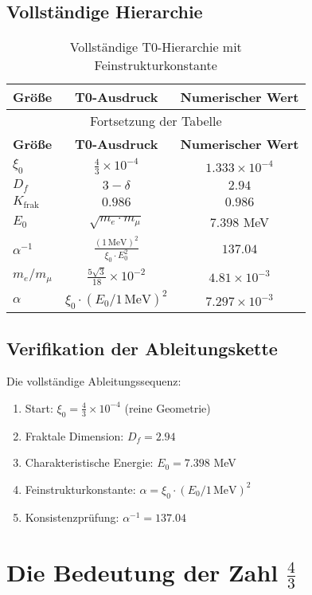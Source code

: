 \documentclass[12pt,a4paper]{article}
\newcommand{\xipar}{\xi_0}
\newcommand{\Kfrak}{K_{\text{frak}}}
\newcommand{\Ezero}{E_0}
\newcommand{\Dfrak}{D_f}
\begin{document}
	\subsection{Vollständige Hierarchie}
	
	\begin{longtable}{lcc}
		\caption{Vollständige T0-Hierarchie mit Feinstrukturkonstante} \\
		\toprule
		\textbf{Größe} & \textbf{T0-Ausdruck} & \textbf{Numerischer Wert} \\
		\midrule
		\endfirsthead
		\multicolumn{3}{c}{Fortsetzung der Tabelle} \\
		\toprule
		\textbf{Größe} & \textbf{T0-Ausdruck} & \textbf{Numerischer Wert} \\
		\midrule
		\endhead
		\bottomrule
		\endlastfoot
		$\xipar$ & $\frac{4}{3} \times 10^{-4}$ & $1.333 \times 10^{-4}$ \\
		$\Dfrak$ & $3 - \delta$ & $2.94$ \\
		$\Kfrak$ & $0.986$ & $0.986$ \\
		$\Ezero$ & $\sqrt{m_e \cdot m_\mu}$ & $7.398$ MeV \\
		$\alpha^{-1}$ & $\frac{(1\,\text{MeV})^2}{\xipar \cdot \Ezero^2}$ & $137.04$ \\
		$m_e/m_\mu$ & $\frac{5\sqrt{3}}{18} \times 10^{-2}$ & $4.81 \times 10^{-3}$ \\
		$\alpha$ & $\xipar \cdot (\Ezero/1\,\text{MeV})^2$ & $7.297 \times 10^{-3}$ \\
	\end{longtable}
	
	\subsection{Verifikation der Ableitungskette}
	
	Die vollständige Ableitungssequenz:
	\begin{enumerate}
		\item Start: $\xipar = \frac{4}{3} \times 10^{-4}$ (reine Geometrie)
		\item Fraktale Dimension: $\Dfrak = 2.94$
		\item Charakteristische Energie: $\Ezero = 7.398$ MeV
		\item Feinstrukturkonstante: $\alpha = \xipar \cdot (\Ezero/1\,\text{MeV})^2$
		\item Konsistenzprüfung: $\alpha^{-1} = 137.04$ \checkmark
	\end{enumerate}
	
	\section{Die Bedeutung der Zahl $\frac{4}{3}$}
	
\end{document}
